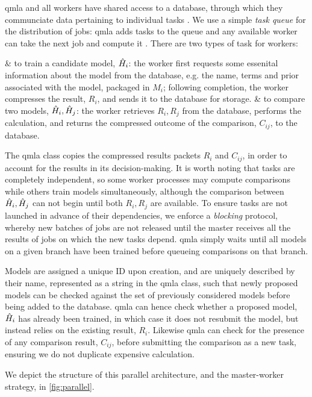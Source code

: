 \par 
\gls{qmla} and all workers have shared access to a database, through which they communciate data pertaining to individual tasks \cite{redis}. 
We use a simple \emph{task queue} for the distribution of jobs: 
    \gls{qmla} adds tasks to the queue and any available worker can take the next job and compute it \cite{redis_queue}. 
There are two types of task for workers:
\begin{easylist}
    & to train a candidate model, $\hat{H}_i$:
        the worker first requests some essenital information about the model from the database, 
        e.g. the name, terms and prior associated with the model, packaged in $M_i$;
        following completion, the worker compresses the result, $R_i$, and sends it to the database for storage. 
    & to compare two models, $\hat{H}_i, \hat{H}_j$: 
        the worker retrieves $R_i, R_j$ from the database, performs the calculation, 
        and returns the compressed outcome of the comparison, $C_{ij}$, to the database. 
\end{easylist}
The \gls{qmla} class copies the compressed results packets $R_i$ and $C_{ij}$,
    in order to account for the results in its decision-making. 
It is worth noting that tasks are completely independent, so some worker processes
    may compute comparisons while others train models simultaneously, 
    although the comparison between $\hat{H}_i, \hat{H}_j$ can not begin until both $R_i, R_j$ are available. 
To ensure tasks are not launched in advance of their dependencies, we enforce a \emph{blocking} protocol, 
    whereby new batches of jobs are not released until the master receives all the results of jobs on which the new tasks depend.
\gls{qmla} simply waits until all models on a given branch have been trained before queueing comparisons 
    on that branch.
\par

Models are assigned a unique ID upon creation,
    and are uniquely described by their name, represented as a string in the \gls{qmla} class, 
    such that newly proposed models can be checked against the set of previously considered models 
    before being added to the database. 
\gls{qmla} can hence check whether a proposed model, $\hat{H}_i$ has already been trained, 
    in which case it does not resubmit the model, but instead relies on the existing result, $R_i$. 
Likewise \gls{qmla} can check for the presence of any comparison result, $C_{ij}$, 
    before submitting the comparison as a new task, 
    ensuring we do not duplicate expensive calculation. 
\par 
We depict the structure of this parallel architecture, and the master-worker strategy, in \cref{fig:parallel}.

